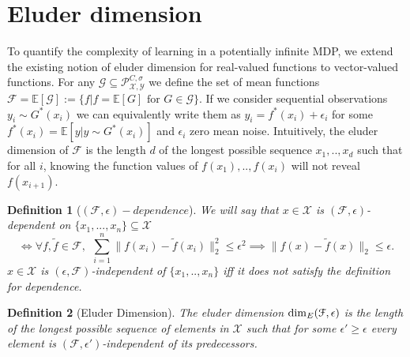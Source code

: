 \documentclass{article}
\newtheorem{mydef}{Definition}
\newcommand{\Exp}{\mathds{E}}
\newcommand{\Xc}{\mathcal{X}}
\newcommand{\Yc}{\mathcal{Y}}
\newcommand{\Pc}{\mathcal{P}}
\newcommand{\Fc}{\mathcal{F}}
\newcommand{\Gc}{\mathcal{G}}
\begin{document}
\section{Eluder dimension}
\label{sec: eluder}
To quantify the complexity of learning in a potentially infinite MDP, we extend the existing notion of eluder dimension for real-valued functions \cite{russo2013eluder} to vector-valued functions.
For any $\Gc \subseteq \Pc^{C,\sigma}_{\Xc,\Yc}$ we define the set of mean functions $\Fc = \Exp[\Gc] := \{f | f=\Exp[G] \text{ for } G \in \Gc \}$.
If we consider sequential observations $y_i \sim G^*(x_i)$ we can equivalently write them as $y_i = f^*(x_i) + \epsilon_i$ for some $f^*(x_i) = \Exp[y | y \sim G^*(x_i)]$ and $\epsilon_i$ zero mean noise.
Intuitively, the eluder dimension of $\Fc$ is the length $d$ of the longest possible sequence $x_1,..,x_d$ such that for all $i$, knowing the function values of $f(x_1),..,f(x_i)$ will not reveal $f(x_{i+1})$.

\begin{mydef}[$ (\mathcal{F},\epsilon)-dependence$]
\hspace{0.00000000000001mm} \newline
We will say that $x \in \mathcal{X}$ is $(\Fc,\epsilon)$-dependent on $\{x_1,...,x_n\} \subseteq \Xc $
$$ \iff \forall f,\tilde{f} \in \Fc, \ \ \sum_{i=1}^{n} \| f(x_i) - \tilde{f}(x_i) \|_2^2 \le \epsilon^2 \implies \| f(x) - \tilde{f}(x)\|_2 \le \epsilon.$$
$x \in \mathcal{X}$ is $(\epsilon,\mathcal{F})$-independent of $\{x_1,..,x_n\}$ iff it does not satisfy the definition for dependence.
\end{mydef}

\begin{mydef}[Eluder Dimension]
\label{def: Eluder} \hspace{0.00000000000001mm} \newline
The eluder dimension ${\rm dim}_E(\Fc,\epsilon)$ is the length of the longest possible sequence of elements in $\Xc$ such that for some $\epsilon' \ge \epsilon$ every element is $(\Fc,\epsilon')$-independent of its predecessors.
\end{mydef}
\end{document}
